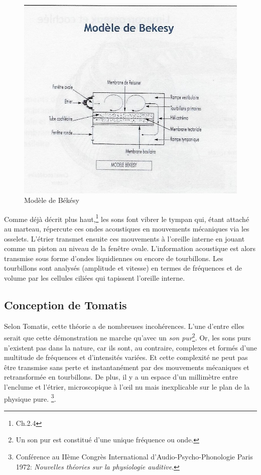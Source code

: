 \begin{figure}
	\centering
	\includegraphics[width=0.7\linewidth]{images/Cochleederoule_bas}
	\caption[Modèle de Békésy]{Modèle de Békésy}
	\label{fig:cochleederoulebas}
\end{figure}

Comme déjà décrit plus haut,\footnote{Ch.2.4} les sons font vibrer le tympan qui,
étant attaché au marteau, répercute ces ondes acoustiques en mouvements mécaniques via les osselets. L'étrier transmet ensuite ces mouvements à l'oreille interne en jouant comme un piston au niveau de la fenêtre
ovale. L'information acoustique est alors transmise sous forme d'ondes
liquidiennes ou encore de tourbillons. Les tourbillons sont analysés (amplitude et vitesse) en termes de fréquences et de volume par les
cellules ciliées qui tapissent l'oreille interne.

\subsection{Conception de Tomatis}

Selon Tomatis, cette théorie a de nombreuses incohérences. L'une
d'entre elles serait que cette démonstration ne marche qu'avec un
\emph{son pur}\footnote{Un son pur est constitué d'une unique fréquence ou onde.}.
Or, les sons purs n'existent pas dans la nature, car ils sont, au
contraire, complexes et formés d'une multitude de fréquences et d'intensités
variées. Et cette complexité ne peut pas être transmise sans perte
et instantanément par des mouvements mécaniques et retransformée en
tourbillons. De plus, il y a un espace d'un millimètre entre l'enclume et l'étrier,
microscopique à l'\oe il nu mais  inexplicable sur le plan de la
physique pure.%
\footnote{Conférence au IIème Congrès International d'Audio-Psycho-Phonologie
Paris 1972:  \emph{Nouvelles théories sur la physiologie auditive}.}.

